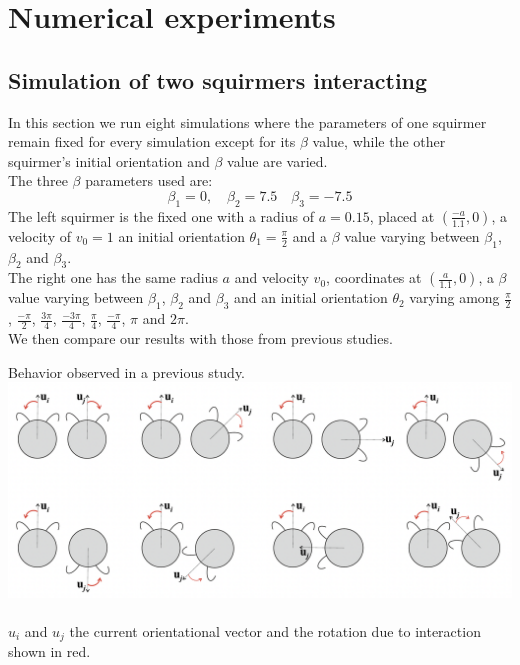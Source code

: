 \documentclass{article}
\begin{document}
\section{Numerical experiments}
\subsection{Simulation of two squirmers interacting}
In this section we run eight simulations where the parameters of one squirmer remain fixed for every simulation 
except for its $\beta$ value, while the other squirmer's 
initial orientation and $\beta$ value are varied.\\
The three $\beta$ parameters used are:
\begin{equation*}
   \beta_1 = 0, \quad \beta_2 = 7.5 \quad \beta_3 = -7.5
\end{equation*}
The left squirmer is the fixed one with a radius of $a=0.15$, placed at $(\frac{-a}{1.1}, 0)$, a velocity of $v_0 = 1$
 an initial orientation $\theta_1 = \frac{\pi}{2}$ and a $\beta$ value varying between $\beta_1$, $\beta_2$ and $\beta_3$.\\
The right one has the same radius $a$ and velocity $v_0$, coordinates at $(\frac{a}{1.1}, 0)$,
 a $\beta$ value varying between $\beta_1$, $\beta_2$ and $\beta_3$ and an initial orientation $\theta_2$ varying among
 $\frac{\pi}{2}$, $\frac{-\pi}{2}$, $\frac{3\pi}{4}$, $\frac{-3\pi}{4}$, $\frac{\pi}{4}$, $\frac{-\pi}{4}$, $\pi$ and $2\pi$.\\
We then compare our results with those from previous studies.
\begin{center}
   Behavior observed in a previous study.
   \includegraphics[width=1\textwidth]{Presentation/images/stark_behavior.png}\\
   \cite{Stark}\\
   $u_i$ and $u_j$ the current orientational vector and the rotation due to interaction shown in red.  
\end{center}
\end{document}
